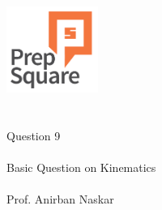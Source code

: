 \documentclass{beamer}
\begin{document}
\begin{center}
\ \\ \ \\
\includegraphics[width=30mm]{Logo-final.png} \\
\ \\ \ \\ 
{\huge Question 9 \\ \ \\ }
{\Large
Basic Question on Kinematics
}
{\large \ \\ \ \\ Prof. Anirban Naskar }
\end{center}
\end{document}
